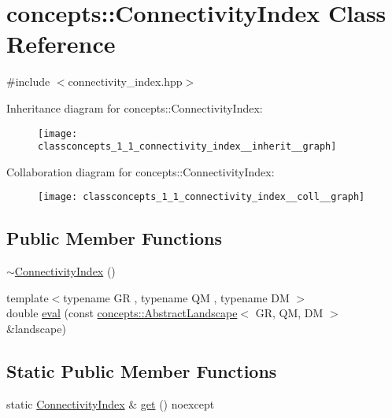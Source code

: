 \hypertarget{classconcepts_1_1_connectivity_index}{}\section{concepts\+:\+:Connectivity\+Index Class Reference}
\label{classconcepts_1_1_connectivity_index}


{\ttfamily \#include $<$connectivity\+\_\+index.\+hpp$>$}



Inheritance diagram for concepts\+:\+:Connectivity\+Index\+:\nopagebreak
\begin{figure}[H]
\begin{center}
\leavevmode
\texttt{[image: classconcepts\_1\_1\_connectivity\_index\_\_inherit\_\_graph]}
\end{center}
\end{figure}


Collaboration diagram for concepts\+:\+:Connectivity\+Index\+:\nopagebreak
\begin{figure}[H]
\begin{center}
\leavevmode
\texttt{[image: classconcepts\_1\_1\_connectivity\_index\_\_coll\_\_graph]}
\end{center}
\end{figure}
\subsection*{Public Member Functions}
\begin{DoxyCompactItemize}
\item 
\hyperlink{classconcepts_1_1_connectivity_index_aa0ca6c18e8caeb3bc8882e7ce4fc0588}{$\sim$\+Connectivity\+Index} ()
\item 
{\footnotesize template$<$typename GR , typename QM , typename DM $>$ }\\double \hyperlink{classconcepts_1_1_connectivity_index_a1718c62ef509fabe0ad1a54cf5a9b0ce}{eval} (const \hyperlink{classconcepts_1_1_abstract_landscape}{concepts\+::\+Abstract\+Landscape}$<$ GR, QM, DM $>$ \&landscape)
\end{DoxyCompactItemize}
\subsection*{Static Public Member Functions}
\begin{DoxyCompactItemize}
\item 
static \hyperlink{classconcepts_1_1_connectivity_index}{Connectivity\+Index} \& \hyperlink{classconcepts_1_1_connectivity_index_a4305f910870c1b5de783d770b35fea09}{get} () noexcept
\end{DoxyCompactItemize}
